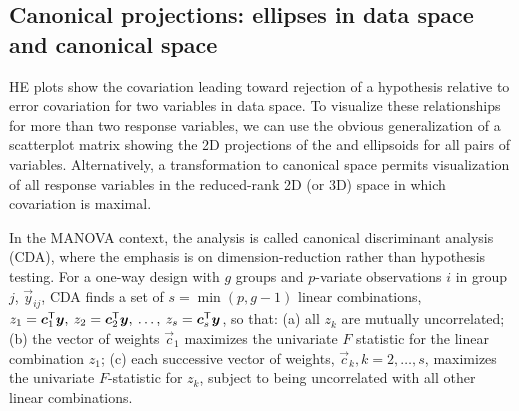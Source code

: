 \subsection{Canonical projections: ellipses in data space and canonical space}

HE plots show the covariation leading toward rejection of a hypothesis relative to
error covariation for two variables in data space. To visualize these relationships for more than two
response variables, we can use the obvious generalization of a scatterplot matrix showing the 2D
projections of the  and  ellipsoids for all pairs of variables.
Alternatively, a transformation to canonical space permits visualization of all response variables
in the reduced-rank 2D (or 3D) space in which  covariation is maximal.



In the MANOVA context, the analysis is called canonical discriminant analysis (CDA), where the emphasis
is on dimension-reduction rather than hypothesis testing.
For a one-way design with $g$ groups and $p$-variate
observations $i$ in group $j$, $\vec{y}_{ij}$, CDA finds a set of $s = \min(p, g-1)$
linear combinations, $z_1 = \bm{c}_1 ^\mathsf{T} \bm{y}, \:
 z_2 = \bm{c}_2 ^\mathsf{T} \bm{y}, \: \dots, \:
 z_s = \bm{c}_s ^\mathsf{T} \bm{y}$,
so that: (a) all $z_k$ are mutually uncorrelated; (b) the vector of
weights $\vec{c}_1$ maximizes the univariate $F$ statistic for the
linear combination $z_1$; (c) each successive vector of weights,
$\vec{c}_k, k=2, \dots, s$, maximizes the univariate $F$-statistic
for $z_k$, subject to being uncorrelated with all other linear
combinations.

